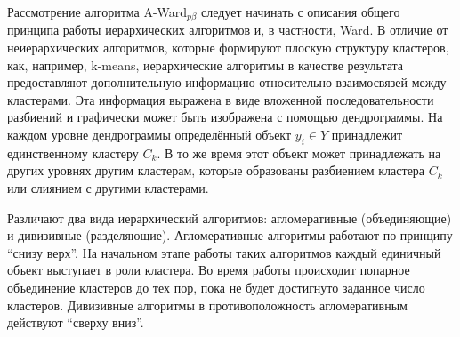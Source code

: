 \documentclass[12pt]{a&t}
\begin{document}
Рассмотрение алгоритма \mbox{A-Ward$ _{p\beta} $} следует начинать с описания общего принципа работы иерархических алгоритмов и, в частности, Ward. В отличие от неиерархических алгоритмов, которые формируют плоскую структуру кластеров, как, например, \mbox{k-means}, иерархические алгоритмы в качестве результата предоставляют дополнительную информацию относительно взаимосвязей между кластерами. Эта информация выражена в виде вложенной последовательности разбиений \cite{Amorim-Makarenkov-Mirkin} и графически может быть изображена с помощью дендрограммы. На каждом уровне дендрограммы определённый объект $ y_i \in Y$ принадлежит единственному кластеру $ C_k $. В то же время этот объект может принадлежать на других уровнях другим кластерам, которые образованы разбиением кластера $ C_k $ или слиянием с другими кластерами. 

Различают два вида иерархический  алгоритмов: агломеративные (объединяющие) и дивизивные (разделяющие). Агломеративные алгоритмы работают по принципу ``снизу верх''. На начальном этапе работы таких алгоритмов каждый единичный объект выступает в роли кластера. Во время работы происходит попарное объединение кластеров до тех пор, пока не будет достигнуто заданное число кластеров. Дивизивные алгоритмы в противоположность агломеративным действуют ``сверху вниз''.
\end{document}
